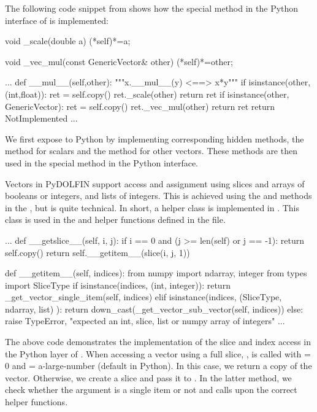 The following code snippet from  shows how the special method  in the Python interface of  is implemented:
\begin{swigcode}
  void _scale(double a)
  {(*self)*=a;}

  void _vec_mul(const GenericVector& other)
  {(*self)*=other;}

   ...
    def __mul__(self,other):
        """x.__mul__(y) <==> x*y"""
        if isinstance(other,(int,float)):
            ret = self.copy()
            ret._scale(other)
            return ret
        if isinstance(other, GenericVector):
            ret = self.copy()
            ret._vec_mul(other)
            return ret
        return NotImplemented
    ...
\end{swigcode}
We first expose  to Python by implementing corresponding
hidden methods, the  method for scalars and the
 method for other vectors. These methods are then used in
the  special method in the Python interface. 

Vectors in PyDOLFIN support access and assignment using slices and \numpy
arrays of booleans or integers, and lists of integers. This is achieved
using the  and  methods in the , 
but is quite technical. In short,  a helper class  
is implemented in . This class is used   
in the  and  helper functions defined
in the  file.
\begin{python}
   ...
    def __getslice__(self, i, j):
        if i == 0 and (j >= len(self) or j == -1):
            return self.copy()
        return self.__getitem__(slice(i, j, 1))

    def __getitem__(self, indices):
        from numpy import ndarray, integer
        from types import SliceType
        if isinstance(indices, (int, integer)):
            return _get_vector_single_item(self, indices)
        elif isinstance(indices, (SliceType, ndarray, list) ):
            return down_cast(_get_vector_sub_vector(self, indices))
        else:
            raise TypeError, "expected an int, slice, list or numpy array of integers"
  ...
\end{python}
The above code demonstrates the implementation of the slice and index
access in the Python layer of . When accessing a vector
using a full slice, ,  is called with
 = 0 and  = a-large-number (default in Python).  In this
case, we return a copy of the vector. Otherwise, we create a slice and pass
it to . In the latter method, we check whether the
 argument is a single item or not and calls upon the 
correct helper functions. 

